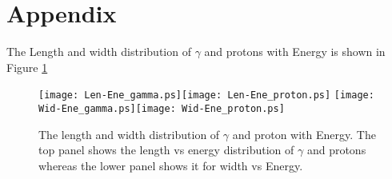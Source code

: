 \documentclass[preprint,12pt]{elsarticle}
\begin{document}



\section{Appendix}
The Length and width distribution of $\gamma$ and protons with Energy is shown in Figure \ref{Figure:lwedist}
\begin{figure}[!h]
\begin{center}
\texttt{[image: Len-Ene\_gamma.ps]}\texttt{[image: Len-Ene\_proton.ps]}
\texttt{[image: Wid-Ene\_gamma.ps]}\texttt{[image: Wid-Ene\_proton.ps]}
\caption{\label{Figure.}The length and width distribution of $\gamma$ and proton with Energy. The top panel shows the length vs energy distribution of $\gamma$ and protons whereas the lower panel shows it 
for width vs Energy.}\label{Figure:lwedist}
\end{center}
\end{figure}
\end{document}
